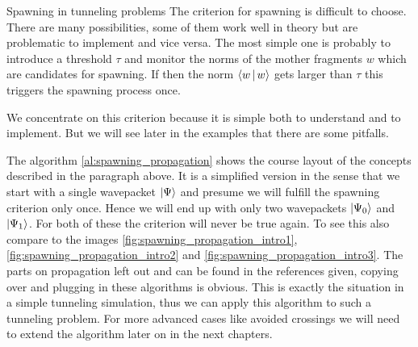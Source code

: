 \begin{chapter}{Spawning in tunneling problems}
The criterion for spawning is difficult to choose. There are many possibilities,
some of them work well in theory but are problematic to implement and vice versa.
The most simple one is probably to introduce a threshold $\tau$ and monitor the
norms of the mother fragments $w$ which are candidates for spawning. If then the
norm $\Braket{w|w}$ gets larger than $\tau$ this triggers the spawning process once.

We concentrate on this criterion because it is simple both to understand and to
implement. But we will see later in the examples that there are some pitfalls.

The algorithm \ref{al:spawning_propagation} shows the course layout of the
concepts described in the paragraph above. It is a simplified version in the
sense that we start with a single wavepacket $\Ket{\Psi}$ and presume we will
fulfill  the spawning criterion only once. Hence we will end up with only
two wavepackets $\Ket{\Psi_0}$ and $\Ket{\Psi_1}$. For both of these the criterion
will never be true again. To see this also compare to the images \ref{fig:spawning_propagation_intro1},
\ref{fig:spawning_propagation_intro2} and \ref{fig:spawning_propagation_intro3}.
The parts on propagation left out and can be found in the references given,
copying over and plugging in these algorithms is obvious. This is exactly the
situation in a simple tunneling simulation, thus we can apply this algorithm
to such a tunneling problem. For more advanced cases like avoided crossings
we will need to extend the algorithm later on in the next chapters.



\end{chapter}
